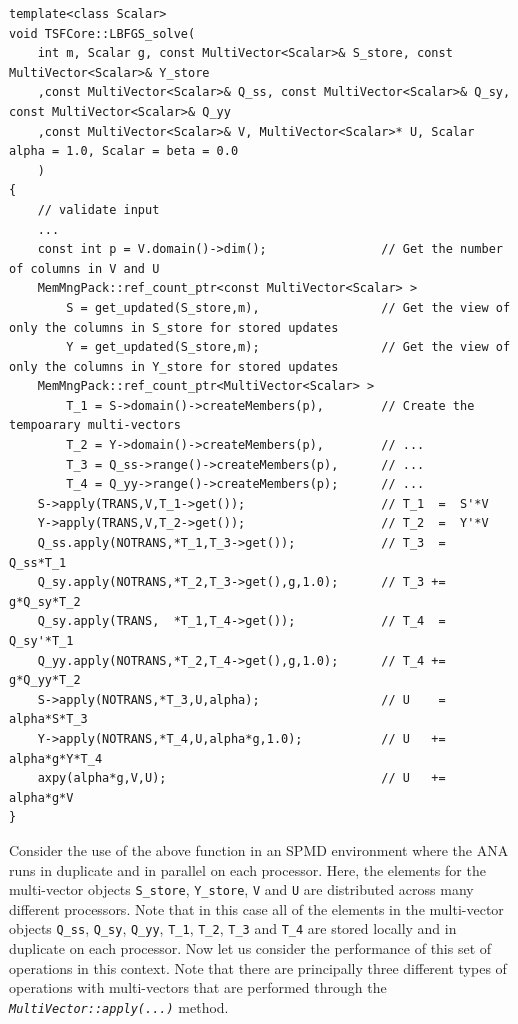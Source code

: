 \documentclass[10pt,fleqn]{article}
\begin{document}
{\scriptsize\begin{verbatim}
template<class Scalar>
void TSFCore::LBFGS_solve(
    int m, Scalar g, const MultiVector<Scalar>& S_store, const MultiVector<Scalar>& Y_store
    ,const MultiVector<Scalar>& Q_ss, const MultiVector<Scalar>& Q_sy, const MultiVector<Scalar>& Q_yy
    ,const MultiVector<Scalar>& V, MultiVector<Scalar>* U, Scalar alpha = 1.0, Scalar = beta = 0.0
    )
{
    // validate input
    ...
    const int p = V.domain()->dim();                // Get the number of columns in V and U
    MemMngPack::ref_count_ptr<const MultiVector<Scalar> >
        S = get_updated(S_store,m),                 // Get the view of only the columns in S_store for stored updates
        Y = get_updated(S_store,m);                 // Get the view of only the columns in Y_store for stored updates
    MemMngPack::ref_count_ptr<MultiVector<Scalar> >
        T_1 = S->domain()->createMembers(p),        // Create the tempoarary multi-vectors
        T_2 = Y->domain()->createMembers(p),        // ...
        T_3 = Q_ss->range()->createMembers(p),      // ...
        T_4 = Q_yy->range()->createMembers(p);      // ...
    S->apply(TRANS,V,T_1->get());                   // T_1  =  S'*V
    Y->apply(TRANS,V,T_2->get());                   // T_2  =  Y'*V
    Q_ss.apply(NOTRANS,*T_1,T_3->get());            // T_3  =  Q_ss*T_1
    Q_sy.apply(NOTRANS,*T_2,T_3->get(),g,1.0);      // T_3 +=  g*Q_sy*T_2
    Q_sy.apply(TRANS,  *T_1,T_4->get());            // T_4  =  Q_sy'*T_1
    Q_yy.apply(NOTRANS,*T_2,T_4->get(),g,1.0);      // T_4 +=  g*Q_yy*T_2
    S->apply(NOTRANS,*T_3,U,alpha);                 // U    =  alpha*S*T_3
    Y->apply(NOTRANS,*T_4,U,alpha*g,1.0);           // U   +=  alpha*g*Y*T_4
    axpy(alpha*g,V,U);                              // U   +=  alpha*g*V
}
\end{verbatim}}

Consider the use of the above function in an SPMD environment where
the ANA runs in duplicate and in parallel on each processor.  Here,
the elements for the multi-vector objects \texttt{S\_store},
\texttt{Y\_store}, \texttt{V} and \texttt{U} are distributed across
many different processors.  Note that in this case all of the elements
in the multi-vector objects \texttt{Q\_ss}, \texttt{Q\_sy}, \texttt{Q\_yy},
\texttt{T\_1}, \texttt{T\_2}, \texttt{T\_3} and \texttt{T\_4} are stored
locally and in duplicate on each processor.  Now let us consider the
performance of this set of operations in this context.  Note that
there are principally three different types of operations with
multi-vectors that are performed through the
\texttt{\textit{MultiVector\-::apply(...)}} method.
\end{document}
